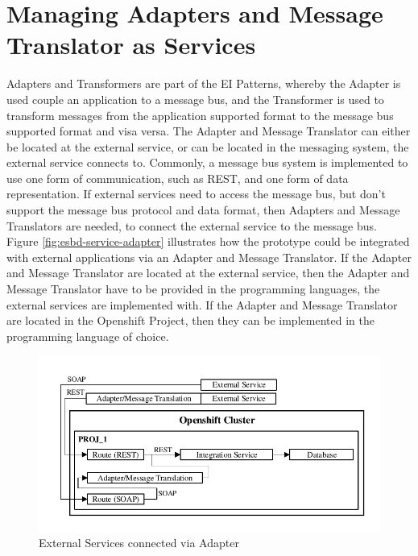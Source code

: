\section{Managing Adapters and Message Translator as Services}
\label{sec:esbd-adap-trans-service}
Adapters and Transformers are part of the EI Patterns, whereby the Adapter is used couple an application to a message bus, and the Transformer is used to transform messages from the application supported format to the message bus supported format and visa versa. The Adapter and Message Translator can either be  located at the external service, or can be located in the messaging system, the external service connects to. Commonly, a message bus system is implemented to use one form of communication, such as REST, and one form of data representation. If external services need to access the message bus, but don't support the message bus protocol and data format, then Adapters and Message Translators are needed, to connect the external service to the message bus. \\

Figure \vref{fig:esbd-service-adapter} illustrates how the prototype could be integrated with external applications via an Adapter and Message Translator. If the Adapter and Message Translator are located at the external service, then the Adapter and Message Translator have to be provided in the programming languages, the external services are implemented with. If the Adapter and Message Translator are located in the Openshift Project, then they can be implemented in the programming language of choice.

\begin{figure}[htbp]
	\centering
	\includegraphics[scale=1]{images/esbd-service-adapter.pdf}
	\caption{External Services connected via Adapter}
	\label{fig:esbd-service-adapter}
\end{figure}

